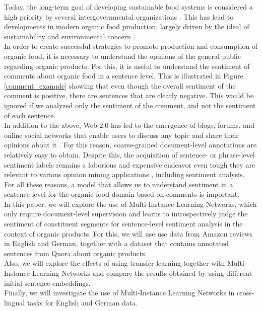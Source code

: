 Today, the  long-term  goal  of  developing  sustainable  food systems is considered a high priority by several intergovernmental  organizations \cite{Mie2017}. This has lead to developments in modern organic food production, largely driven by the ideal of sustainability and environmental concern \cite{healthyNutritiousFood}.\\
In order to create successful strategies to promote production and consumption of organic food, it is necessary to understand the opinions of the general public regarding organic products. For this, it is useful to understand the sentiment of comments about organic food in a sentence level. This is illustrated in Figure \ref{comment_example} showing that even though the overall sentiment of the comment is positive, there are sentences that are clearly negative. This would be ignored if we analyzed only the sentiment of the comment, and not the sentiment of each sentence.\\
In addition to the above, Web 2.0 has led to the emergence of blogs, forums, and online social networks that enable users to discuss any topic and share their opinions about it \cite{Dang_2020}. For this reason, coarse-grained document-level annotations are relatively easy to obtain. Despite this, the acquisition of  sentence-  or  phrase-level  sentiment  labels  remains  a  laborious  and  expensive endeavor even tough they are relevant to various opinion mining applications \cite{angelidis2017multiple}, including sentiment analysis.\\
For all these reasons, a model that allows us to understand sentiment in a sentence level for the organic food domain based on comments is important.\\
In this paper, we will explore the use of Multi-Instance Learning Networks, which only require document-level supervision and learns to introspectively judge the sentiment  of  constituent  segments \cite{angelidis2017multiple} for sentence-level sentiment analysis in the context of organic products. For this, we will use use data from Amazon reviews in English and German, together with a dataset that contains annotated sentences from Quora about organic products.\\
Also, we will explore the effects of using transfer learning together with Multi-Instance Learning Networks and compare the results obtained by using different initial sentence embeddings.\\
Finally, we will investigate the use of Multi-Instance Learning Networks in cross-lingual tasks for English and German data. \\
